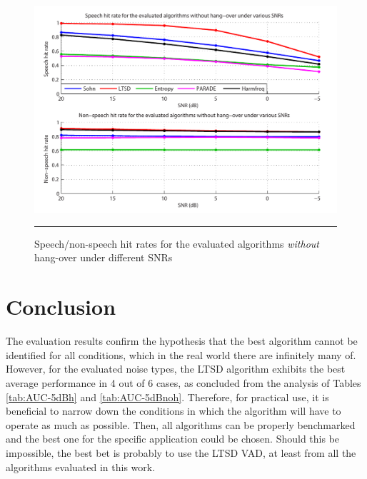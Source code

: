 \begin{figure}[htbp]
	\centering
		\includegraphics[width=0.9\columnwidth]{Figures/Chapter4/snrnohbold.pdf}
		\rule{37em}{0.5pt}
	\caption[Speech/non-speech hit rates for the evaluated algorithms \emph{without} hang-over under different SNRs]{Speech/non-speech hit rates for the evaluated algorithms \emph{without} hang-over under different SNRs}
	\label{fig:snrnoh}
\end{figure}


\section{Conclusion}

The evaluation results confirm the hypothesis that the best algorithm cannot be identified for all conditions, which in the real world there are infinitely many of. However, for the evaluated noise types, the LTSD algorithm exhibits the best average performance in 4 out of 6 cases, as concluded from the analysis of Tables \ref{tab:AUC-5dBh} and \ref{tab:AUC-5dBnoh}. Therefore, for practical use, it is beneficial to narrow down the conditions in which the algorithm will have to operate as much as possible. Then, all algorithms can be properly benchmarked and the best one for the specific application could be chosen. Should this be impossible, the best bet is probably to use the LTSD VAD, at least from all the algorithms evaluated in this work.